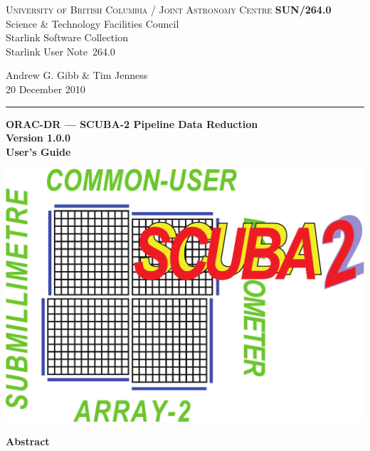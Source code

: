 \documentclass[twoside,11pt]{article}
\newcommand{\stardoccategory}  {Starlink User Note}
\newcommand{\stardocinitials}  {SUN}
\newcommand{\stardocnumber}    {264.0}
\newcommand{\stardocauthors}   {Andrew G. Gibb \& Tim Jenness}
\newcommand{\stardocdate}      {20 December 2010}
\newcommand{\stardoctitle}     {ORAC-DR --- SCUBA-2 Pipeline Data Reduction}
\newcommand{\stardocversion}   {Version 1.0.0}
\newcommand{\stardocmanual}    {User's Guide}
\newcommand{\stardocname}{\stardocinitials /\stardocnumber}
\newenvironment{latexonly}{}{}
\renewcommand{\_}{\texttt{\symbol{95}}}
\begin{document}
\thispagestyle{empty}

\begin{latexonly}
   \textsc{University of British Columbia} / \textsc{Joint Astronomy Centre} \hfill \textbf{\stardocname}\\
   {\large Science \& Technology Facilities Council}\\
   {\large Starlink Software Collection\\}
   {\large \stardoccategory\ \stardocnumber}
   \begin{flushright}
   \stardocauthors\\
   \stardocdate
   \end{flushright}
   \vspace{-4mm}
   \rule{\textwidth}{0.5mm}
   \vspace{5mm}
   \begin{center}
   {\Huge\textbf{\stardoctitle \\ [2.5ex]}}
   {\LARGE\textbf{\stardocversion \\ [4ex]}}
   {\Huge\textbf{\stardocmanual}}
   \end{center}
   \vspace{5mm}

\begin{center}
\includegraphics[scale=0.3]{sun264_logo}
\end{center}

   \vspace{10mm}
   \begin{center}
      {\Large\textbf{Abstract}}
   \end{center}
\end{latexonly}
\end{document}
